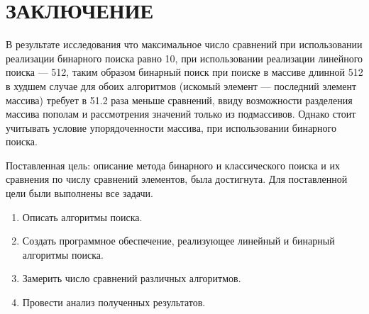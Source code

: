 \chapter*{\hfill{\centering  ЗАКЛЮЧЕНИЕ}\hfill}

В результате исследования что максимальное число сравнений при использовании реализации бинарного поиска равно 10, при использовании реализации линейного поиска --- 512, таким образом бинарный поиск при поиске в массиве длинной 512 в худшем случае для обоих алгоритмов (искомый элемент --- последний элемент массива) требует в 51.2 раза меньше сравнений, ввиду возможности разделения массива пополам и рассмотрения значений только из подмассивов. Однако стоит учитывать условие упорядоченности массива, при использовании бинарного поиска.


Поставленная цель: описание метода бинарного и классического поиска и их сравнения по числу сравнений элементов, была достигнута.
Для поставленной цели были выполнены все задачи.
\begin{enumerate}
	\item Описать алгоритмы поиска.
	\item Создать программное обеспечение, реализующее линейный и бинарный алгоритмы поиска.
	\item Замерить число сравнений различных алгоритмов.
	\item Провести анализ полученных результатов.
\end{enumerate}

